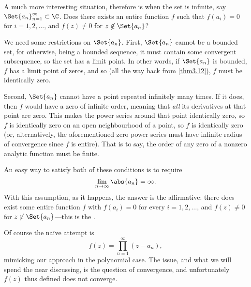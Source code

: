 A much more interesting situation, therefore is when the set is infinite, say $\Set{a_n}_{n = 1}^\infty \subset \C$.
Does there exists an entire function $f$ such that $f(a_i) = 0$ for $i = 1, 2, \dots$, and $f(z) \neq 0$ for $z \not\in \Set{a_n}$?

We need some restrictions on $\Set{a_n}$.
First, $\Set{a_n}$ cannot be a bounded set, for otherwise, being a bounded sequence, it must contain some convergent subsequence, so the set has a limit point.
In other words, if $\Set{a_n}$ is bounded, $f$ has a limit point of zeros, and so (all the way back from \autoref{thm3.12}), $f$ must be identically zero.

Second, $\Set{a_n}$ cannot have a point repeated infinitely many times.
If it does, then $f$ would have a zero of infinite order, meaning that \emph{all} its derivatives at that point are zero.
This makes the power series around that point identically zero, so $f$ is identically zero on an open neighbourhood of a point, so $f$ is identically zero (or, alternatively, the aforementioned zero power series must have infinite radius of convergence since $f$ is entire).
That is to say, the order of any zero of a nonzero analytic function must be finite.

An easy way to satisfy both of these conditions is to require
\[
	\lim_{n \to \infty} \abs{a_n} = \infty.
\]
With this assumption, as it happens, the answer is the affirmative: there does exist some entire function $f$ with $f(a_i) = 0$ for every $i = 1, 2, \dots$, and $f(z) \neq 0$ for $z \not\in \Set{a_n}$---this is the .

Of course the naïve attempt is
\[
	f(z) = \prod_{n = 1}^\infty (z - a_n),
\]
mimicking our approach in the polynomial case.
The issue, and what we will spend the near discussing, is the question of convergence, and unfortunately $f(z)$ thus defined does not converge.
